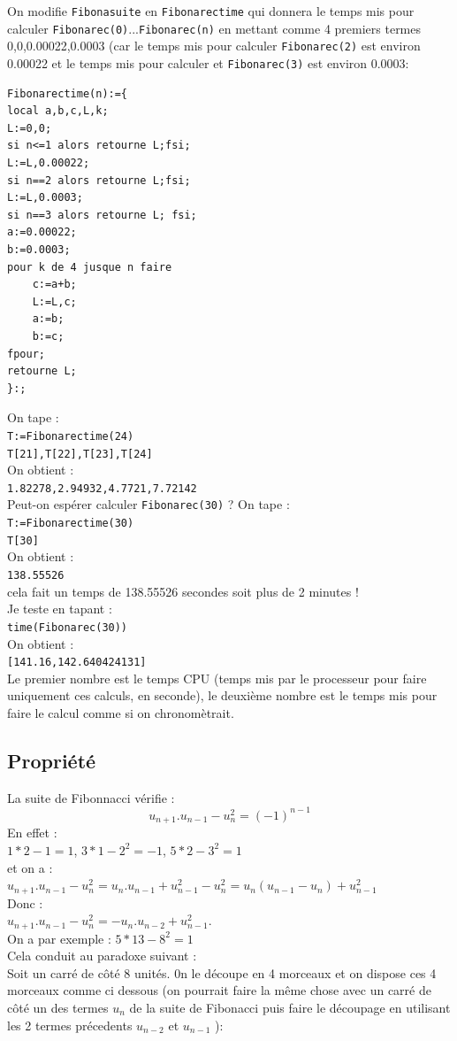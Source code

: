 \documentclass[a4paper,11pt]{book}
\begin{document}
On modifie {\tt Fibonasuite} en {\tt Fibonarectime} qui donnera le temps mis 
pour calculer {\tt Fibonarec(0)}...{\tt Fibonarec(n)} en mettant comme 
4 premiers termes 0,0,0.00022,0.0003 (car le temps mis 
pour calculer  {\tt Fibonarec(2)} est environ 0.00022 et le temps mis 
pour calculer et {\tt Fibonarec(3)} est environ 0.0003:\\
\begin{verbatim}
Fibonarectime(n):={
local a,b,c,L,k;
L:=0,0;
si n<=1 alors retourne L;fsi;
L:=L,0.00022;
si n==2 alors retourne L;fsi;
L:=L,0.0003;
si n==3 alors retourne L; fsi;
a:=0.00022;
b:=0.0003;
pour k de 4 jusque n faire
    c:=a+b;
    L:=L,c;
    a:=b;
    b:=c;
fpour;
retourne L;   
}:;
\end{verbatim}
On tape :\\
{\tt T:=Fibonarectime(24)}\\
{\tt T[21],T[22],T[23],T[24]}\\
On obtient :\\
{\tt 1.82278,2.94932,4.7721,7.72142}\\
Peut-on esp\'erer calculer {\tt Fibonarec(30)} ?
On tape :\\
{\tt T:=Fibonarectime(30)}\\
{\tt T[30]}\\
On obtient :\\
{\tt 138.55526}\\
cela fait un temps de 138.55526 secondes soit plus de 2 minutes !\\
Je teste en tapant :\\
{\tt time(Fibonarec(30))}\\
On obtient :\\
{\tt[141.16,142.640424131] }\\
Le premier nombre est le temps CPU (temps mis par le processeur pour faire 
uniquement ces calculs, en seconde), le deuxi\`eme nombre est le temps mis pour 
faire le calcul comme si on chronom\`etrait. 
\subsection{Propri\'et\'e}
La suite de Fibonnacci v\'erifie :\\
$$u_{n+1}.u_{n-1}-u_n^2=(-1)^{n-1}$$
En effet :\\
$1*2-1=1$, $3*1-2^2=-1$, $5*2-3^2=1$\\
et on a :\\
$u_{n+1}.u_{n-1}-u_n^2=u_n.u_{n-1}+u_{n-1}^2-u_n^2=u_n(u_{n-1}-u_n)+u_{n-1}^2$\\
Donc :\\
$u_{n+1}.u_{n-1}-u_n^2=-u_n.u_{n-2}+u_{n-1}^2$.\\
On a par exemple :
$5*13-8^2=1$ \\
Cela conduit au paradoxe suivant :\\
Soit un carr\'e de c\^ot\'e 8 unit\'es. 0n  le d\'ecoupe en 4 morceaux et on 
dispose ces 4 morceaux comme ci dessous (on pourrait faire la m\^eme chose avec
un carr\'e de c\^ot\'e un des termes $u_n$ de la suite de Fibonacci puis faire 
le d\'ecoupage en utilisant les 2 termes pr\'ecedents $u_{n-2}$ et $u_{n-1}$ ):\\
\end{document}
